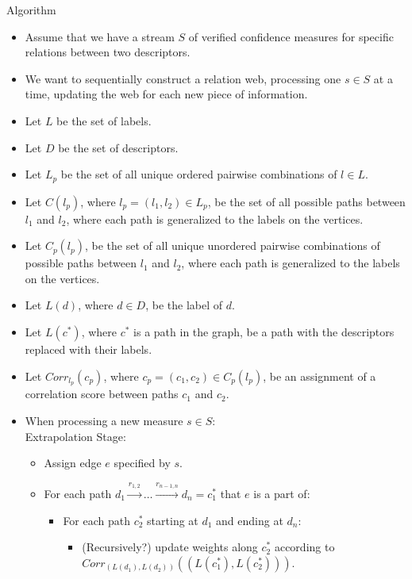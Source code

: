 \documentclass[a4paper]{article}
\begin{document}
Algorithm
\begin{itemize}
    \item Assume that we have a stream $S$ of verified confidence measures for 
        specific relations between two descriptors.
    \item We want to sequentially construct a relation web, processing one
        $s \in S$ at a time, updating the web for each new piece of
        information.
    \item Let $L$ be the set of labels.
    \item Let $D$ be the set of descriptors.
    \item Let $L_p$ be the set of all unique ordered pairwise combinations of
        $l \in L$.
    \item Let $C(l_p)$, where $l_p = (l_1, l_2) \in L_p$, be the set of all
        possible paths between $l_1$ and $l_2$, where each path is generalized
        to the labels on the vertices.
    \item Let $C_p(l_p)$, be the set of all unique unordered pairwise 
        combinations of possible paths between $l_1$ and $l_2$, where each 
        path is generalized to the labels on the vertices.
    \item Let $L(d)$, where $d \in D$, be the label of $d$.
    \item Let $L(c^*)$, where $c^*$ is a path in the graph, be a path with the
        descriptors replaced with their labels.
    \item Let $Corr_{l_p}(c_p)$, where $c_p = (c_1, c_2) \in C_p(l_p)$, be an
        assignment of a correlation score between paths $c_1$ and $c_2$.
    \item When processing a new measure $s \in S$:\\
    Extrapolation Stage:
    \begin{itemize}
        \item Assign edge $e$ specified by $s$.
        \item For each path $d_1 \xrightarrow{r_{1, 2}} \dots 
            \xrightarrow{r_{n - 1, n}} d_n = c_1^*$ that $e$ is a part of:
        \begin{itemize}
            \item For each path $c_2^*$ starting at $d_1$ and ending at $d_n$:
            \begin{itemize}
                \item (Recursively?) update weights along $c_2^*$ according to
                    $Corr_{(L(d_1), L(d_2))}((L(c_1^*), L(c_2^*)))$.

\end{itemize}
\end{itemize}
\end{itemize}
\end{itemize}
\end{document}
